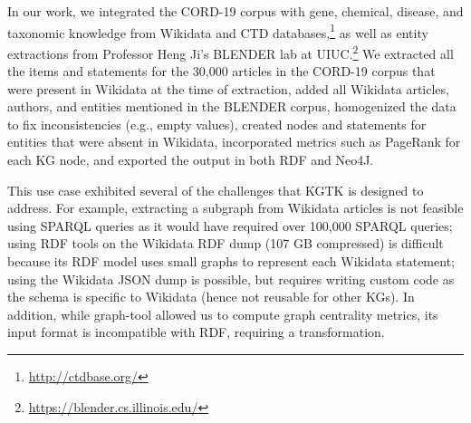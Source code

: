 \documentclass[runningheads]{llncs}
\newcommand{\kibitz}[2]{%
{\color{#1}#2}{}%
}
\newcommand{\DS}[1]{\kibitz{blue}{[DS: #1]}} %
\newcommand{\DG}[1]{\kibitz{red}{[DG: #1]}} %
\begin{document}
In our work, we integrated the CORD-19 corpus with gene, chemical, disease, and taxonomic knowledge from Wikidata and CTD databases,\footnote{\url{http://ctdbase.org/}} as well as entity extractions from Professor Heng Ji's BLENDER lab at UIUC.\footnote{\url{https://blender.cs.illinois.edu/}} We extracted all the items and statements for the 30,000 articles in the CORD-19 corpus \cite{Wang2020} that were present in Wikidata at the time of extraction, added all Wikidata articles, authors, and entities mentioned in the BLENDER corpus, homogenized the data to fix inconsistencies (e.g., empty values), created nodes and statements for entities that were absent in Wikidata, incorporated metrics such as PageRank for each KG node, and exported the output in both RDF and Neo4J. 

This use case exhibited several of the challenges that KGTK is designed to address. For example, extracting a subgraph from Wikidata articles is not feasible using SPARQL queries as it would have required over 100,000 SPARQL queries; using RDF tools on the Wikidata RDF dump (107 GB compressed) is difficult because its RDF model uses small graphs to represent each Wikidata statement; using the Wikidata JSON dump is possible, but requires writing custom code as the schema is specific to Wikidata (hence not reusable for other KGs). In addition, while graph-tool allowed us to compute graph centrality metrics, its input format is incompatible with RDF, requiring a transformation. 

\end{document}
